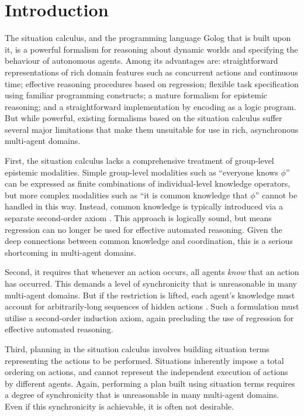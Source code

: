 


\chapter{Introduction}

The situation calculus, and the programming language Golog that is
built upon it, is a powerful formalism for reasoning about dynamic
worlds and specifying the behaviour of autonomous agents. Among its
advantages are: straightforward representations of rich domain features
such as concurrent actions and continuous time; effective reasoning
procedures based on regression; flexible task specification using
familiar programming constructs; a mature formalism for epistemic
reasoning; and a straightforward implementation by encoding as a logic
program. But while powerful, existing formalisms based on the situation
calculus suffer several major limitations that make them unsuitable
for use in rich, asynchronous multi-agent domains.

First, the situation calculus lacks a comprehensive treatment of group-level
epistemic modalities. Simple group-level modalities such as {}``everyone
knows $\phi$'' can be expressed as finite combinations of individual-level
knowledge operators, but more complex modalities such as {}``it is
common knowledge that $\phi$'' cannot be handled in this way. Instead,
common knowledge is typically introduced via a separate second-order
axiom \citep{davis05fo_ma_theory,ghaderi07sc_joint_ability}. This
approach is logically sound, but means regression can no longer be
used for effective automated reasoning. Given the deep connections
between common knowledge and coordination, this is a serious shortcoming
in multi-agent domains.

Second, it requires that whenever an action occurs, all agents \emph{know}
that an action has occurred. This demands a level of synchronicity
that is unreasonable in many multi-agent domains. But if the restriction
is lifted, each agent's knowledge must account for arbitrarily-long
sequences of hidden actions \citep{Lesperance99sitcalc_approach}.
Such a formulation must utilise a second-order induction axiom, again
precluding the use of regression for effective automated reasoning.

Third, planning in the situation calculus involves building situation
terms representing the actions to be performed. Situations inherently
impose a total ordering on actions, and cannot represent the independent
execution of actions by different agents. Again, performing a plan
built using situation terms requires a degree of synchronicity that
is unreasonable in many multi-agent domains. Even if this synchronicity
is achievable, it is often not desirable.

